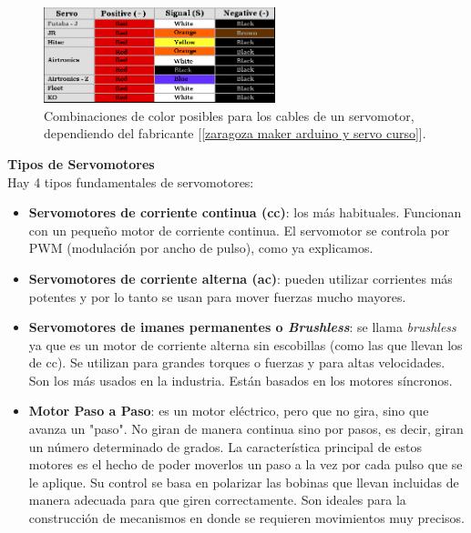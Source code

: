 \documentclass[12pt]{article}
\begin{document}
	\begin{figure}[h]
		\begin{center}
			\includegraphics[width=0.6\textwidth]{img/servo_wire_color_code.png}
			\caption{Combinaciones de color posibles para los cables de un servomotor, dependiendo del fabricante [\ref{zaragoza maker arduino y servo curso}].}
			\label{servo wire color code}
		\end{center}
	\end{figure}
	
	\pagebreak
	
	\noindent \textbf{Tipos de Servomotores}\\
	
	\noindent Hay 4 tipos fundamentales de servomotores:
	
	\begin{itemize}
		\item \textbf{Servomotores de corriente continua (cc)}: los más habituales. Funcionan con un pequeño motor de corriente continua. El servomotor se controla por PWM (modulación por ancho de pulso), como ya explicamos.
		\item \textbf{Servomotores de corriente alterna (ac)}: pueden utilizar corrientes más potentes y por lo tanto se usan para mover fuerzas mucho mayores.
		\item \textbf{Servomotores de imanes permanentes o \textit{Brushless}}: se llama \textit{brushless} ya que es un motor de corriente alterna sin escobillas (como las que llevan los de cc). Se utilizan para grandes torques o fuerzas y para altas velocidades. Son los más usados en la industria. Están basados en los motores síncronos.
		\item \textbf{Motor Paso a Paso}: es un motor eléctrico, pero que no gira, sino que avanza un "paso". No giran de manera continua sino por pasos, es decir, giran un número determinado de grados. La característica principal de estos motores es el hecho de poder moverlos un paso a la vez por cada pulso que se le aplique. Su control se basa en polarizar las bobinas que llevan incluidas de manera adecuada para que giren correctamente. Son ideales para la construcción de mecanismos en donde se requieren movimientos muy precisos.
	\end{itemize}
	
\end{document}
